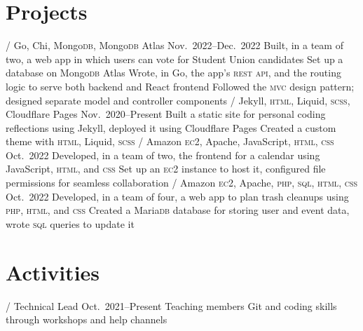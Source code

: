 \section{Projects}
\begin{doutline}
     / Go, Chi, Mongo\textsc{db}, Mongo\textsc{db} Atlas
    \hfill Nov.\ 2022--Dec.\ 2022
        \2 Built, in a team of two, a web app in which users can vote for Student Union candidates
            \3 Set up a database on Mongo\textsc{db} Atlas
            \3 Wrote, in Go, the app's \textsc{rest} \textsc{api}, and the routing logic to serve both backend and React frontend
            \3 Followed the \textsc{mvc} design pattern; designed separate model and controller components
     / Jekyll, \textsc{html}, Liquid, \textsc{scss}, Cloudflare Pages
    \hfill Nov.\ 2020--Present
        \2 Built a static site for personal coding reflections using Jekyll, deployed it using Cloudflare Pages
            \3 Created a custom theme with \textsc{html}, Liquid, \textsc{scss}
     / Amazon \textsc{ec2}, Apache, JavaScript, \textsc{html}, \textsc{css}
    \hfill Oct.\ 2022
        \2 Developed, in a team of two, the frontend for a calendar using JavaScript, \textsc{html}, and \textsc{css}
        \2 Set up an \textsc{ec2} instance to host it, configured file permissions for seamless collaboration
    \1[Trashfree] / Amazon \textsc{ec2}, Apache, \textsc{php}, \textsc{sql}, \textsc{html}, \textsc{css}
    \hfill Oct.\ 2022
        \2 Developed, in a team of four, a web app to plan trash cleanups using \textsc{php}, \textsc{html}, and \textsc{css}
        \2 Created a Maria\textsc{db} database for storing user and event data, wrote \textsc{sql} queries to update it
\end{doutline}

\section{Activities}
\begin{doutline}
     / Technical Lead
    \hfill Oct.\ 2021--Present
        \2 Teaching members Git and coding skills through workshops and help channels
\end{doutline}
